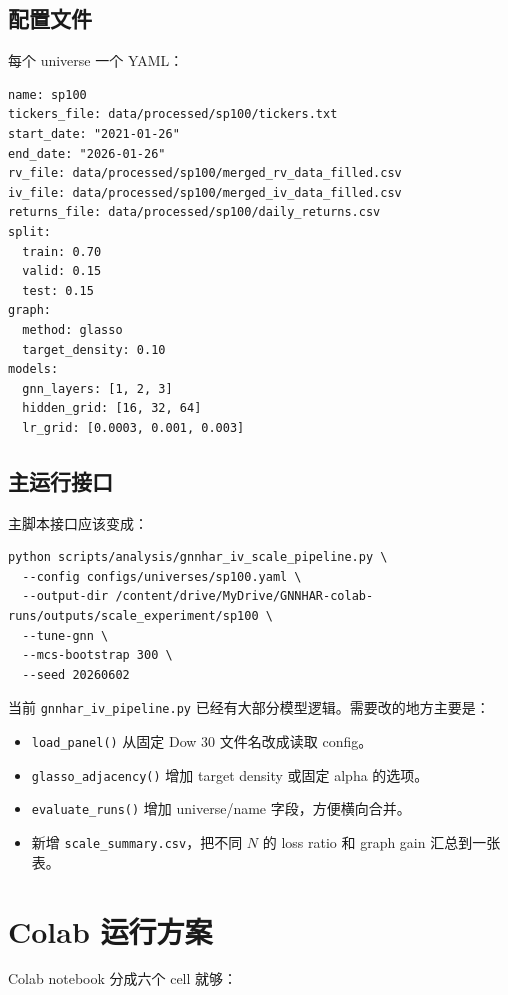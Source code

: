 \documentclass[11pt,a4paper]{ctexart}
\begin{document}
\subsection{配置文件}

每个 universe 一个 YAML：

\begin{lstlisting}
name: sp100
tickers_file: data/processed/sp100/tickers.txt
start_date: "2021-01-26"
end_date: "2026-01-26"
rv_file: data/processed/sp100/merged_rv_data_filled.csv
iv_file: data/processed/sp100/merged_iv_data_filled.csv
returns_file: data/processed/sp100/daily_returns.csv
split:
  train: 0.70
  valid: 0.15
  test: 0.15
graph:
  method: glasso
  target_density: 0.10
models:
  gnn_layers: [1, 2, 3]
  hidden_grid: [16, 32, 64]
  lr_grid: [0.0003, 0.001, 0.003]
\end{lstlisting}

\subsection{主运行接口}

主脚本接口应该变成：

\begin{lstlisting}
python scripts/analysis/gnnhar_iv_scale_pipeline.py \
  --config configs/universes/sp100.yaml \
  --output-dir /content/drive/MyDrive/GNNHAR-colab-runs/outputs/scale_experiment/sp100 \
  --tune-gnn \
  --mcs-bootstrap 300 \
  --seed 20260602
\end{lstlisting}

当前 \texttt{gnnhar\_iv\_pipeline.py} 已经有大部分模型逻辑。需要改的地方主要是：

\begin{itemize}[leftmargin=*]
\item \texttt{load\_panel()} 从固定 Dow 30 文件名改成读取 config。
\item \texttt{glasso\_adjacency()} 增加 target density 或固定 alpha 的选项。
\item \texttt{evaluate\_runs()} 增加 universe/name 字段，方便横向合并。
\item 新增 \texttt{scale\_summary.csv}，把不同 \(N\) 的 loss ratio 和 graph gain 汇总到一张表。
\end{itemize}

\section{Colab 运行方案}

Colab notebook 分成六个 cell 就够：
\end{document}
